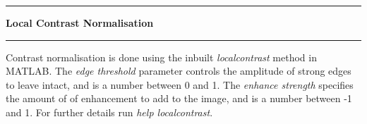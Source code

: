 \noindent\rule{\textwidth}{1pt}
\indent \textbf{Local Contrast Normalisation}
\noindent\rule{\textwidth}{1pt}
\smallskip
\parbox{\textwidth}{Contrast normalisation is done using the inbuilt \textit{localcontrast} method in MATLAB. The \textit{edge threshold} parameter controls the amplitude of strong edges to leave intact, and is a number between 0 and 1. The \textit{enhance strength} specifies the amount of of enhancement to add to the image, and is a number between -1 and 1. For further details run \textit{help localcontrast}.}
\smallskip
